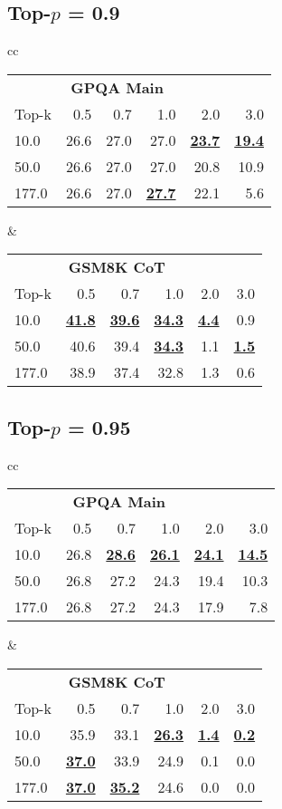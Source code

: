 \documentclass{article}
\begin{document}
\begin{table*}[ht]
\subsection*{Top-\(p\) = 0.9}
\begin{tabular}{cc}
\begin{tabular}{lrrrrr}
\toprule
\multicolumn{5}{c}{\textbf{GPQA Main}} \\
Top-k & 0.5 & 0.7 & 1.0 & 2.0 & 3.0 \\
\midrule
10.0 & 26.6 & 27.0 & 27.0 & \textbf{\underline{23.7}} & \textbf{\underline{19.4}} \\
50.0 & 26.6 & 27.0 & 27.0 & 20.8 & 10.9 \\
177.0 & 26.6 & 27.0 & \textbf{\underline{27.7}} & 22.1 & 5.6 \\
\bottomrule
\end{tabular}
&
\begin{tabular}{lrrrrr}
\toprule
\multicolumn{5}{c}{\textbf{GSM8K CoT}} \\
Top-k & 0.5 & 0.7 & 1.0 & 2.0 & 3.0 \\
\midrule
10.0 & \textbf{\underline{41.8}} & \textbf{\underline{39.6}} & \textbf{\underline{34.3}} & \textbf{\underline{4.4}} & 0.9 \\
50.0 & 40.6 & 39.4 & \textbf{\underline{34.3}} & 1.1 & \textbf{\underline{1.5}} \\
177.0 & 38.9 & 37.4 & 32.8 & 1.3 & 0.6 \\
\bottomrule
\end{tabular}
\end{tabular}

\subsection*{Top-\(p\) = 0.95}
\begin{tabular}{cc}
\begin{tabular}{lrrrrr}
\toprule
\multicolumn{5}{c}{\textbf{GPQA Main}} \\
Top-k & 0.5 & 0.7 & 1.0 & 2.0 & 3.0 \\
\midrule
10.0 & 26.8 & \textbf{\underline{28.6}} & \textbf{\underline{26.1}} & \textbf{\underline{24.1}} & \textbf{\underline{14.5}} \\
50.0 & 26.8 & 27.2 & 24.3 & 19.4 & 10.3 \\
177.0 & 26.8 & 27.2 & 24.3 & 17.9 & 7.8 \\
\bottomrule
\end{tabular}
&
\begin{tabular}{lrrrrr}
\toprule
\multicolumn{5}{c}{\textbf{GSM8K CoT}} \\
Top-k & 0.5 & 0.7 & 1.0 & 2.0 & 3.0 \\
\midrule
10.0 & 35.9 & 33.1 & \textbf{\underline{26.3}} & \textbf{\underline{1.4}} & \textbf{\underline{0.2}} \\
50.0 & \textbf{\underline{37.0}} & 33.9 & 24.9 & 0.1 & 0.0 \\
177.0 & \textbf{\underline{37.0}} & \textbf{\underline{35.2}} & 24.6 & 0.0 & 0.0 \\
\bottomrule
\end{tabular}
\end{tabular}

\end{table*}
\end{document}
